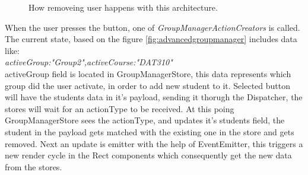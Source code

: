 \begin{figure}[h]
  \scalebox{0.8}{}
  \caption{How removeing user happens with this architecture.}
  \label{fig:advancedfluxaddstudent}
\end{figure}

When the user presses the button, one of \emph{GroupManagerActionCreators} is called. The current state, based on the figure \ref{fig:advancedgroupmanager} includes data like:
\\\emph{activeGroup:"Group2",activeCourse:"DAT310" }
\\activeGroup field is located in GroupManagerStore, this data represents which group did the user activate, in order to add new student to it. Selected button will have the students data in it's payload, sending it thorugh the Dispatcher, the stores will wait for an actionType to be received. At this poing GroupManagerStore sees the actionType, and updates it's students field, the student in the payload gets matched with the existing one in the store and gets removed. Next an update is emitter with the help of EventEmitter, this triggers a new render cycle in the Rect components which consequently get the new data from the stores.
